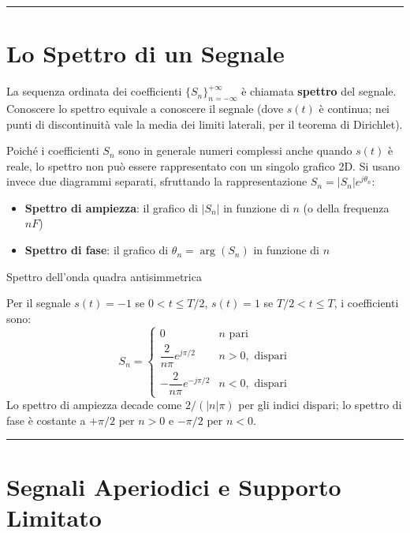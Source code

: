 \documentclass[
  italian,
  openany]{book}
\providecommand{\tightlist}{%
  \setlength{\itemsep}{0pt}\setlength{\parskip}{0pt}}
\begin{document}
\begin{center}\rule{0.5\linewidth}{0.5pt}\end{center}

\section{Lo Spettro di un Segnale}\label{lo-spettro-di-un-segnale}

La sequenza ordinata dei coefficienti \(\{S_n\}_{n=-\infty}^{+\infty}\)
è chiamata \textbf{spettro} del segnale. Conoscere lo spettro equivale a
conoscere il segnale (dove \(s(t)\) è continua; nei punti di
discontinuità vale la media dei limiti laterali, per il teorema di
Dirichlet).

Poiché i coefficienti \(S_n\) sono in generale numeri complessi anche
quando \(s(t)\) è reale, lo spettro non può essere rappresentato con un
singolo grafico 2D. Si usano invece due diagrammi separati, sfruttando
la rappresentazione \(S_n = |S_n| e^{j\theta_n}\):

\begin{itemize}
\tightlist
\item
  \textbf{Spettro di ampiezza}: il grafico di \(|S_n|\) in funzione di
  \(n\) (o della frequenza \(nF\))
\item
  \textbf{Spettro di fase}: il grafico di \(\theta_n = \arg(S_n)\) in
  funzione di \(n\)
\end{itemize}

\begin{callouttip}{Spettro dell’onda quadra antisimmetrica}

Per il segnale \(s(t) = -1\) se \(0 < t \le T/2\), \(s(t) = 1\) se
\(T/2 < t \le T\), i coefficienti sono:
\[S_n = \begin{cases} 0 & n \text{ pari} \\ \dfrac{2}{n\pi} e^{j\pi/2} & n > 0, \text{ dispari} \\ -\dfrac{2}{n\pi} e^{-j\pi/2} & n < 0, \text{ dispari} \end{cases}\]
Lo spettro di ampiezza decade come \(2/(|n|\pi)\) per gli indici
dispari; lo spettro di fase è costante a \(+\pi/2\) per \(n > 0\) e
\(-\pi/2\) per \(n < 0\).

\end{callouttip}

\begin{center}\rule{0.5\linewidth}{0.5pt}\end{center}

\section{Segnali Aperiodici e Supporto
Limitato}\label{segnali-aperiodici-e-supporto-limitato}
\end{document}
